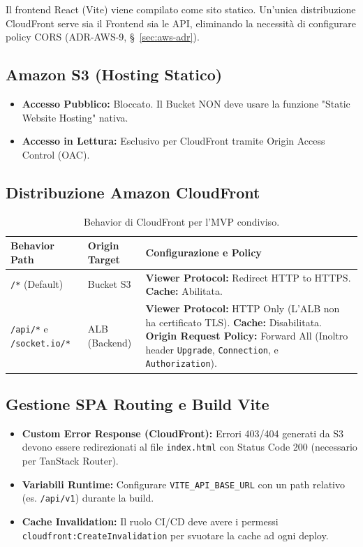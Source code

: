\documentclass[11pt,a4paper]{article}
\begin{document}
Il frontend React (Vite) viene compilato come sito statico. Un'unica distribuzione CloudFront serve sia il Frontend sia le API, eliminando la necessità di configurare policy CORS (ADR-AWS-9, \S~\ref{sec:aws-adr}).

\subsection{Amazon S3 (Hosting Statico)}

\begin{itemize}
    \item \textbf{Accesso Pubblico:} Bloccato. Il Bucket NON deve usare la funzione "Static Website Hosting" nativa.
    \item \textbf{Accesso in Lettura:} Esclusivo per CloudFront tramite Origin Access Control (OAC).
\end{itemize}

\subsection{Distribuzione Amazon CloudFront}

\begin{table}[H]
\centering
\caption{Behavior di CloudFront per l'MVP condiviso.}
\label{tab:aws-cloudfront}
\vspace{2mm}
\renewcommand{\arraystretch}{1.2}
\begin{tabularx}{\textwidth}{|l|l|X|}
\hline
\textbf{Behavior Path} & \textbf{Origin Target} & \textbf{Configurazione e Policy} \\ \hline
\texttt{/*} (Default) & Bucket S3 & \textbf{Viewer Protocol:} Redirect HTTP to HTTPS. \textbf{Cache:} Abilitata. \\ \hline
\texttt{/api/*} e \texttt{/socket.io/*} & ALB (Backend) & \textbf{Viewer Protocol:} HTTP Only (L'ALB non ha certificato TLS). \textbf{Cache:} Disabilitata. \textbf{Origin Request Policy:} Forward All (Inoltro header \texttt{Upgrade}, \texttt{Connection}, e \texttt{Authorization}). \\ \hline
\end{tabularx}
\end{table}

\subsection{Gestione SPA Routing e Build Vite}

\begin{itemize}
    \item \textbf{Custom Error Response (CloudFront):} Errori 403/404 generati da S3 devono essere redirezionati al file \texttt{index.html} con Status Code 200 (necessario per TanStack Router).
    \item \textbf{Variabili Runtime:} Configurare \texttt{VITE\_API\_BASE\_URL} con un path relativo (es. \texttt{/api/v1}) durante la build.
    \item \textbf{Cache Invalidation:} Il ruolo CI/CD deve avere i permessi \texttt{cloudfront:}\linebreak[0]\texttt{CreateInvalidation} per svuotare la cache ad ogni deploy.
\end{itemize}
\end{document}
